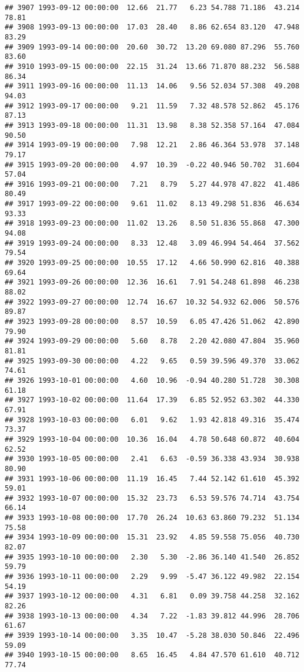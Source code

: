 \documentclass{article}\usepackage{graphicx, color}
\makeatletter
\newenvironment{kframe}{%
 \def\at@end@of@kframe{}%
 \ifinner\ifhmode%
  \def\at@end@of@kframe{\end{minipage}}%
  \begin{minipage}{\columnwidth}%
 \fi\fi%
 \def\FrameCommand##1{\hskip\@totalleftmargin \hskip-\fboxsep
 \colorbox{shadecolor}{##1}\hskip-\fboxsep
     \hskip-\linewidth \hskip-\@totalleftmargin \hskip\columnwidth}%
 \MakeFramed {\advance\hsize-\width
   \@totalleftmargin\z@ \linewidth\hsize
   \@setminipage}}%
 {\par\unskip\endMakeFramed%
 \at@end@of@kframe}
\newenvironment{knitrout}{}{} %
\makeatother
\begin{document}
\begin{knitrout}
\begin{kframe}
\begin{verbatim}
## 3907 1993-09-12 00:00:00  12.66  21.77   6.23 54.788 71.186  43.214  78.81
## 3908 1993-09-13 00:00:00  17.03  28.40   8.86 62.654 83.120  47.948  83.29
## 3909 1993-09-14 00:00:00  20.60  30.72  13.20 69.080 87.296  55.760  83.60
## 3910 1993-09-15 00:00:00  22.15  31.24  13.66 71.870 88.232  56.588  86.34
## 3911 1993-09-16 00:00:00  11.13  14.06   9.56 52.034 57.308  49.208  94.03
## 3912 1993-09-17 00:00:00   9.21  11.59   7.32 48.578 52.862  45.176  87.13
## 3913 1993-09-18 00:00:00  11.31  13.98   8.38 52.358 57.164  47.084  90.50
## 3914 1993-09-19 00:00:00   7.98  12.21   2.86 46.364 53.978  37.148  79.17
## 3915 1993-09-20 00:00:00   4.97  10.39  -0.22 40.946 50.702  31.604  57.04
## 3916 1993-09-21 00:00:00   7.21   8.79   5.27 44.978 47.822  41.486  80.49
## 3917 1993-09-22 00:00:00   9.61  11.02   8.13 49.298 51.836  46.634  93.33
## 3918 1993-09-23 00:00:00  11.02  13.26   8.50 51.836 55.868  47.300  94.08
## 3919 1993-09-24 00:00:00   8.33  12.48   3.09 46.994 54.464  37.562  79.54
## 3920 1993-09-25 00:00:00  10.55  17.12   4.66 50.990 62.816  40.388  69.64
## 3921 1993-09-26 00:00:00  12.36  16.61   7.91 54.248 61.898  46.238  88.02
## 3922 1993-09-27 00:00:00  12.74  16.67  10.32 54.932 62.006  50.576  89.87
## 3923 1993-09-28 00:00:00   8.57  10.59   6.05 47.426 51.062  42.890  79.90
## 3924 1993-09-29 00:00:00   5.60   8.78   2.20 42.080 47.804  35.960  81.81
## 3925 1993-09-30 00:00:00   4.22   9.65   0.59 39.596 49.370  33.062  74.61
## 3926 1993-10-01 00:00:00   4.60  10.96  -0.94 40.280 51.728  30.308  61.18
## 3927 1993-10-02 00:00:00  11.64  17.39   6.85 52.952 63.302  44.330  67.91
## 3928 1993-10-03 00:00:00   6.01   9.62   1.93 42.818 49.316  35.474  73.37
## 3929 1993-10-04 00:00:00  10.36  16.04   4.78 50.648 60.872  40.604  62.52
## 3930 1993-10-05 00:00:00   2.41   6.63  -0.59 36.338 43.934  30.938  80.90
## 3931 1993-10-06 00:00:00  11.19  16.45   7.44 52.142 61.610  45.392  59.01
## 3932 1993-10-07 00:00:00  15.32  23.73   6.53 59.576 74.714  43.754  66.14
## 3933 1993-10-08 00:00:00  17.70  26.24  10.63 63.860 79.232  51.134  75.58
## 3934 1993-10-09 00:00:00  15.31  23.92   4.85 59.558 75.056  40.730  82.07
## 3935 1993-10-10 00:00:00   2.30   5.30  -2.86 36.140 41.540  26.852  59.79
## 3936 1993-10-11 00:00:00   2.29   9.99  -5.47 36.122 49.982  22.154  54.19
## 3937 1993-10-12 00:00:00   4.31   6.81   0.09 39.758 44.258  32.162  82.26
## 3938 1993-10-13 00:00:00   4.34   7.22  -1.83 39.812 44.996  28.706  61.67
## 3939 1993-10-14 00:00:00   3.35  10.47  -5.28 38.030 50.846  22.496  59.09
## 3940 1993-10-15 00:00:00   8.65  16.45   4.84 47.570 61.610  40.712  77.74

\end{verbatim}
\end{kframe}
\end{knitrout}
\end{document}
